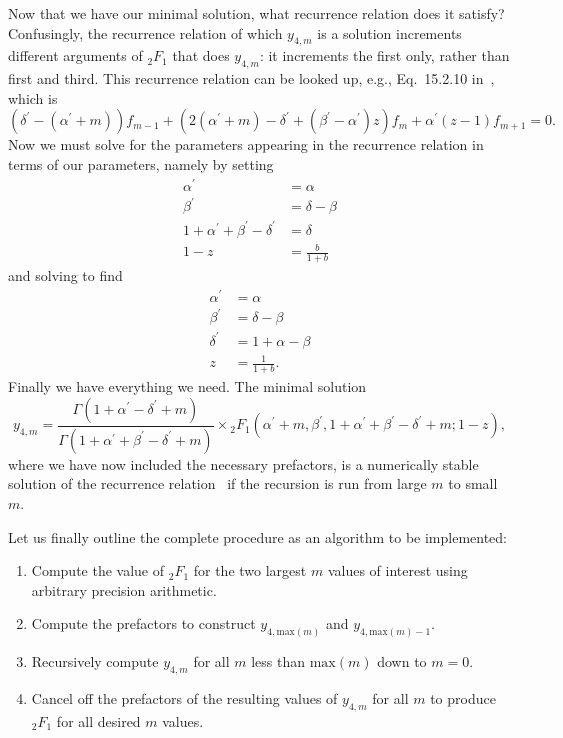 Now that we have our minimal solution,
what recurrence relation does it satisfy?
Confusingly, the recurrence relation of which $y_{4,m}$ is a solution
increments different arguments of ${_2F_1}$ that does $y_{4,m}$:
it increments the first only, rather than first and third.
This recurrence relation can be looked up, e.g., Eq.~15.2.10
in~\cite{Abramowitz1964}, which is
\begin{equation}
(\delta^\prime - (\alpha^\prime + m)) f_{m-1}
+
(2(\alpha^\prime+m) - \delta^\prime + (\beta^\prime - \alpha^\prime)z)f_m
+ \alpha^\prime(z-1) f_{m+1} = 0.
\label{eq:chosen_rec_rel}
\end{equation}
Now we must solve for the parameters appearing in the recurrence relation
in terms of our parameters, namely by setting
\begin{equation}
\begin{split}
\alpha^\prime &= \alpha
\\
\beta^\prime &= \delta - \beta
\\
1 + \alpha^\prime + \beta^\prime - \delta^\prime &= \delta
\\
1 - z &= \frac{b}{1+b}
\end{split}
\end{equation}
and solving to find
\begin{equation}
\begin{split}
\alpha^\prime &= \alpha
\\
\beta^\prime &= \delta - \beta
\\
\delta^\prime &= 1 + \alpha - \beta
\\
z &= \frac{1}{1+b}
.
\end{split}
\end{equation}
Finally we have everything we need. The minimal solution
\begin{equation}
y_{4,m}
=
\frac{\Gamma(1+\alpha^\prime-\delta^\prime+m)}
        {\Gamma(1+\alpha^\prime+\beta^\prime-\delta^\prime+m)}
\times
{_2F_1}\left(\alpha^\prime + m,
                \beta^\prime,
                1+\alpha^\prime+\beta^\prime-\delta^\prime+m;
                1-z\right),
\end{equation}
where we have now included the necessary prefactors,
is a numerically stable solution of the recurrence
relation~ if the recursion is run
from large $m$ to small $m$.

Let us finally outline the complete procedure as an algorithm to be implemented:
\begin{enumerate}
\item Compute the value of ${_2F_1}$ for the two
largest $m$ values of interest using arbitrary precision arithmetic.
\item Compute the prefactors to construct
$y_{4,\text{max}(m)}$ and $y_{4,\text{max}(m)-1}$.
\item Recursively compute $y_{4,m}$ for all $m$ less than $\text{max}(m)$ down
to $m=0$.
\item Cancel off the prefactors of the resulting values of
$y_{4,m}$ for all $m$ to produce ${_2F_1}$ for all desired $m$ values.
\end{enumerate}

